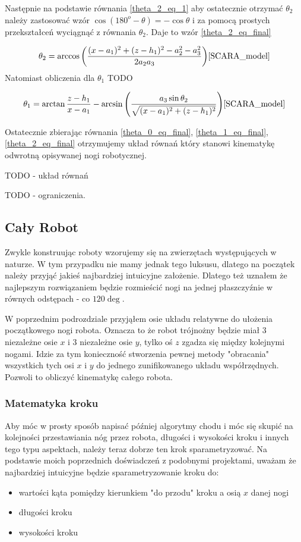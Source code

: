 \documentclass[a4paper,13pt]{article}
\begin{document}
Następnie na podstawie równania \ref{theta_2_eq_1} aby ostatecznie otrzymać $\theta_2$ należy zastosować wzór $\cos{(180^o - \theta)} = -\cos{\theta}$ i za pomocą prostych przekształceń wyciągnąć z równania $\theta_2$. Daje to wzór \ref{theta_2_eq_final}

\begin{equation} \label{theta_2_eq_final}
\theta_2 = \arccos{\left( \frac{(x - a_1)^2 + (z - h_1)^2 - a_2^2 - a_3^2}{2 a_2 a_3} \right)}\\ \cite{SCARA_model}
\end{equation}
Natomiast obliczenia dla $\theta_1$ TODO

\begin{equation}\label{theta_1_eq_final}
\theta_1 = \arctan{\frac{z - h_1}{x - a_1}} - \arcsin{\left( \frac{a_3 \sin{\theta_2} }{ \sqrt{ (x - a_1)^2 + (z - h_1)^2}} \right)}\\ \cite{SCARA_model}
\end{equation}

Ostatecznie zbierając równania \ref{theta_0_eq_final}, \ref{theta_1_eq_final}, \ref{theta_2_eq_final} otrzymujemy układ równań który stanowi kinematykę odwrotną opisywanej nogi robotycznej.

TODO - układ równań

TODO - ograniczenia.

\subsection{Cały Robot}
Zwykle konstruując roboty wzorujemy się na zwierzętach występujących w naturze. W tym przypadku nie mamy jednak tego luksusu, dlatego na początek należy przyjąć jakieś najbardziej intuicyjne założenie. Dlatego też uznałem że najlepszym rozwiązaniem będzie rozmieścić nogi na jednej płaszczyźnie w równych odstępach - co $120\deg$.

W poprzednim podrozdziale przyjąłem osie układu relatywne do ułożenia początkowego nogi robota. Oznacza to że robot trójnożny będzie miał 3 niezależne osie $x$ i 3 niezależne osie $y$, tylko oś $z$ zgadza się między kolejnymi nogami. Idzie za tym konieczność stworzenia pewnej metody "obracania" wszystkich tych osi $x$ i $y$ do jednego zunifikowanego układu współrzędnych. Pozwoli to obliczyć kinematykę całego robota.

\subsubsection{Matematyka kroku}
Aby móc w prosty sposób napisać później algorytmy chodu i móc się skupić na kolejności przestawiania nóg przez robota, długości i wysokości kroku i innych tego typu aspektach, należy teraz dobrze ten krok sparametryzować. Na podstawie moich poprzednich doświadczeń z podobnymi projektami, uważam że najbardziej intuicyjne będzie sparametryzowanie kroku do:
\begin{itemize}
\item wartości kąta pomiędzy kierunkiem "do przodu" kroku a osią $x$ danej nogi
\item długości kroku
\item wysokości kroku
\end{itemize}
\end{document}
